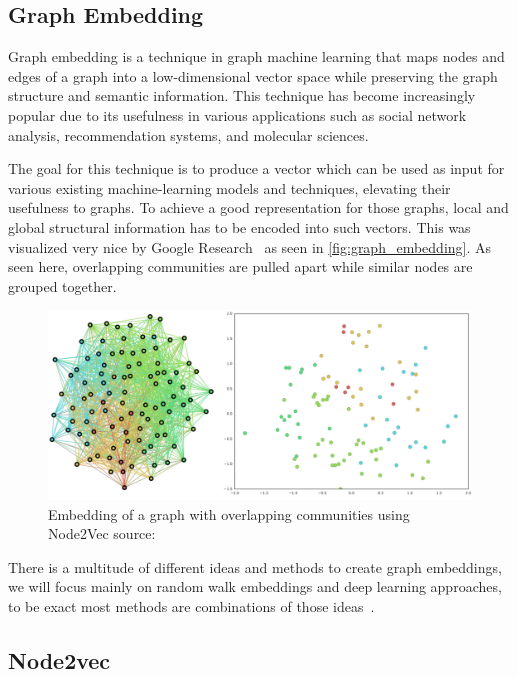 \subsection{Graph Embedding}
Graph embedding is a technique in graph machine learning that maps nodes and edges of a graph into a low-dimensional vector space while preserving the graph structure and semantic information. This technique has become increasingly popular due to its usefulness in various applications such as social network analysis, recommendation systems, and molecular sciences.

The goal for this technique is to produce a vector which can be used as input for various existing machine-learning models and techniques, elevating their usefulness to graphs. To achieve a good representation for those graphs, local and global structural information has to be encoded into such vectors. This was visualized very nice by Google Research~\cite{epasto2019embedding} as seen in \autoref{fig:graph_embedding}. As seen here, overlapping communities are pulled apart while similar nodes are grouped together.

\begin{figure}[ht!]
    \centering
    \includegraphics[scale=0.35]{tex/res/graph_embedding.png}
    \caption{Embedding of a graph with overlapping communities using Node2Vec \tiny{source: \cite{epasto2019embedding}}}
    \label{fig:graph_embedding}
\end{figure}

There is a multitude of different ideas and methods to create graph embeddings, we will focus mainly on random walk embeddings and deep learning approaches, to be exact most methods are combinations of those ideas~\cite{2017graph2vec,2016node2vec,2021graphormer}.
\subsection{Node2vec}

